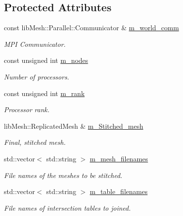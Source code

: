 \subsection*{Protected Attributes}
\begin{DoxyCompactItemize}
\item 
const lib\+Mesh\+::\+Parallel\+::\+Communicator \& \hyperlink{classcarl_1_1_stitch___meshes_a7a19535c9488135f3fb68f18a04a9442}{m\+\_\+world\+\_\+comm}
\begin{DoxyCompactList}\small\item\em M\+P\+I Communicator. \end{DoxyCompactList}\item 
const unsigned int \hyperlink{classcarl_1_1_stitch___meshes_a9e20d5781074c285506605f0af1d024b}{m\+\_\+nodes}
\begin{DoxyCompactList}\small\item\em Number of processors. \end{DoxyCompactList}\item 
const unsigned int \hyperlink{classcarl_1_1_stitch___meshes_a50b57beb1d6c0688641a52a9156b8dd2}{m\+\_\+rank}
\begin{DoxyCompactList}\small\item\em Processor rank. \end{DoxyCompactList}\item 
lib\+Mesh\+::\+Replicated\+Mesh \& \hyperlink{classcarl_1_1_stitch___meshes_abebb40f413d1dbce1d74f9280e978ed7}{m\+\_\+\+Stitched\+\_\+mesh}
\begin{DoxyCompactList}\small\item\em Final, stitched mesh. \end{DoxyCompactList}\item 
std\+::vector$<$ std\+::string $>$ \hyperlink{classcarl_1_1_stitch___meshes_afc9fe061a29560f4807ed560409eb374}{m\+\_\+mesh\+\_\+filenames}
\begin{DoxyCompactList}\small\item\em File names of the meshes to be stitched. \end{DoxyCompactList}\item 
std\+::vector$<$ std\+::string $>$ \hyperlink{classcarl_1_1_stitch___meshes_a45f392e103d8b859857981971165dc0d}{m\+\_\+table\+\_\+filenames}
\begin{DoxyCompactList}\small\item\em File names of intersection tables to joined. \end{DoxyCompactList}\item 

\end{DoxyCompactItemize}
